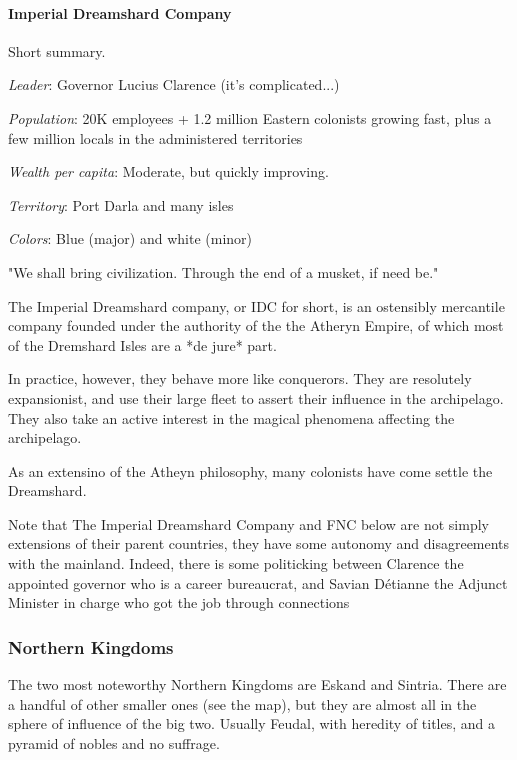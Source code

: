 \paragraph{Imperial Dreamshard Company}

Short summary.

\textit{Leader}: Governor Lucius Clarence (it's complicated...)

\textit{Population}: 20K employees + 1.2 million Eastern colonists growing fast, plus a few million locals in the administered territories

\textit{Wealth per capita}: Moderate, but quickly improving.

\textit{Territory}: Port Darla and many isles

\textit{Colors}: Blue (major) and white (minor)


\begin{rpg-quotebox}
    "We shall bring civilization. Through the end of a musket, if need be."
    \end{rpg-quotebox}
    



The Imperial Dreamshard company, or IDC for short, is an ostensibly mercantile company founded under the authority of the the Atheryn Empire, of which most of the Dremshard Isles are a *de jure* part.

In practice, however, they behave more like conquerors. They are resolutely expansionist, and use their large fleet to assert their influence in the archipelago. They also take an active interest in the magical phenomena affecting the archipelago.

As an extensino of the Atheyn philosophy, many colonists have come settle the Dreamshard.


Note that The Imperial Dreamshard Company and FNC below are not simply extensions of their parent countries, they have some autonomy and disagreements with the mainland. Indeed, there is some politicking between Clarence the appointed governor who is a career bureaucrat, and Savian Détianne the Adjunct Minister in charge who got the job through connections



\subsubsection{Northern Kingdoms}

The two most noteworthy Northern Kingdoms are Eskand and Sintria. There are a handful of other smaller ones (see the map), but they are almost all in the sphere of influence of the big two. Usually Feudal, with heredity of titles, and a pyramid of nobles and no suffrage.




